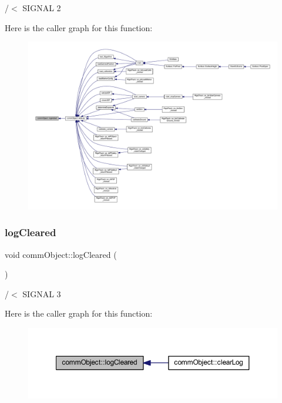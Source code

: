 /$<$ S\+I\+G\+N\+AL 2 

Here is the caller graph for this function\+:\nopagebreak
\begin{figure}[H]
\begin{center}
\leavevmode
\includegraphics[width=350pt]{classcomm_object_a72620fe1bac16309baf6d148644edaf9_icgraph}
\end{center}
\end{figure}
\mbox{\label{classcomm_object_af2304085624c26230e9d930d616e3e19}} 
\subsubsection{\texorpdfstring{log\+Cleared}{logCleared}}
{\footnotesize\ttfamily void comm\+Object\+::log\+Cleared (\begin{DoxyParamCaption}{ }\end{DoxyParamCaption})\hspace{0.3cm}{\ttfamily [signal]}}



/$<$ S\+I\+G\+N\+AL 3 

Here is the caller graph for this function\+:\nopagebreak
\begin{figure}[H]
\begin{center}
\leavevmode
\includegraphics[width=350pt]{classcomm_object_af2304085624c26230e9d930d616e3e19_icgraph}
\end{center}
\end{figure}
\mbox{\label{classcomm_object_af369de87a7f2c9b7170223bedd6c08d9}} 
